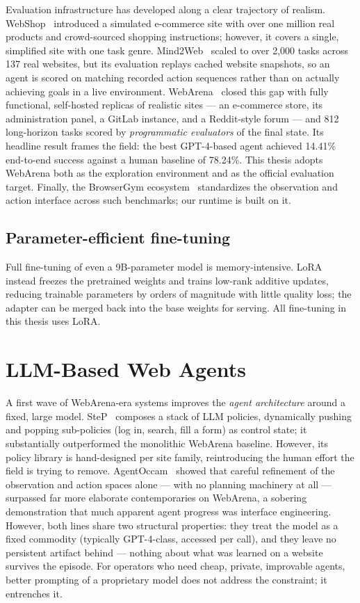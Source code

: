 Evaluation infrastructure has developed along a clear trajectory of realism.
WebShop~\cite{yao2022webshop} introduced a simulated e-commerce site with
over one million real products and crowd-sourced shopping instructions;
however, it covers a single, simplified site with one task genre.
Mind2Web~\cite{deng2023mind2web} scaled to over 2{,}000 tasks across 137
real websites, but its evaluation replays cached website snapshots, so an
agent is scored on matching recorded action sequences rather than on actually
achieving goals in a live environment.
WebArena~\cite{zhou2024webarena} closed this gap with fully functional,
self-hosted replicas of realistic sites --- an e-commerce store, its
administration panel, a GitLab instance, and a Reddit-style forum --- and 812
long-horizon tasks scored by \emph{programmatic evaluators} of the final
state. Its headline result frames the field: the best GPT-4-based agent
achieved 14.41\% end-to-end success against a human baseline of 78.24\%.
This thesis adopts WebArena both as the exploration environment and as the
official evaluation target. Finally, the BrowserGym
ecosystem~\cite{dechezelles2025browsergym} standardizes the observation and
action interface across such benchmarks; our runtime is built on it.

\subsection{Parameter-efficient fine-tuning}

Full fine-tuning of even a 9B-parameter model is memory-intensive.
LoRA~\cite{hu2022lora} instead freezes the pretrained weights and trains
low-rank additive updates, reducing trainable parameters by orders of
magnitude with little quality loss; the adapter can be merged back into the
base weights for serving. All fine-tuning in this thesis uses LoRA.

\section{LLM-Based Web Agents}
\label{sec:rel-llm-agents}

A first wave of WebArena-era systems improves the \emph{agent architecture}
around a fixed, large model. SteP~\cite{sodhi2024step} composes a stack of
LLM policies, dynamically pushing and popping sub-policies (log in, search,
fill a form) as control state; it substantially outperformed the monolithic
WebArena baseline. However, its policy library is hand-designed per site
family, reintroducing the human effort the field is trying to remove.
AgentOccam~\cite{yang2024agentoccam} showed that careful refinement of the
observation and action spaces alone --- with no planning machinery at all ---
surpassed far more elaborate contemporaries on WebArena, a sobering
demonstration that much apparent agent progress was interface engineering.
However, both lines share two structural properties: they treat the model as
a fixed commodity (typically GPT-4-class, accessed per call), and they leave
no persistent artifact behind --- nothing about what was learned on a website
survives the episode. For operators who need cheap, private, improvable
agents, better prompting of a proprietary model does not address the
constraint; it entrenches it.

